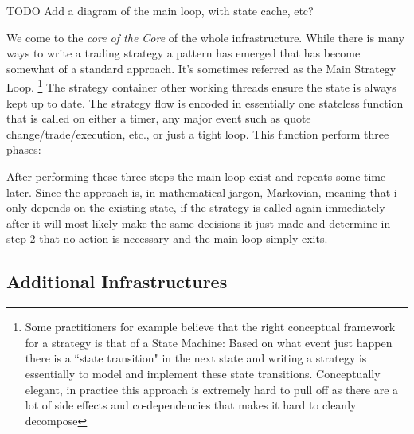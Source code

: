 TODO Add a diagram of the main loop, with state cache, etc?

We come to the \emph{core of the Core} of the whole infrastructure. While there is many ways to write a trading strategy a pattern has emerged that has become somewhat of a standard approach. It's sometimes referred as the Main Strategy Loop. \footnote{Some practitioners for example believe that the right conceptual framework for a strategy is that of a State Machine: Based on what event just happen there is a ``state transition" in the next state and writing a strategy is essentially to model and implement these state transitions. Conceptually elegant, in practice this approach is extremely hard to pull off as there are a lot of side effects and co-dependencies that makes it hard to cleanly decompose}
The strategy container other working threads ensure the state is always kept up to date. The strategy flow is encoded in essentially one stateless function that is called on either a timer, any major event such as quote change/trade/execution, etc., or just a tight loop. This function perform three phases:
After performing these three steps the main loop exist and repeats some time later. Since the approach is, in mathematical jargon, Markovian, meaning that i only depends on the existing state, if the strategy is called again immediately after it will most likely make the same decisions it just made and determine in step 2 that no action is necessary and the main loop simply exits.

\subsection{Additional Infrastructures}
